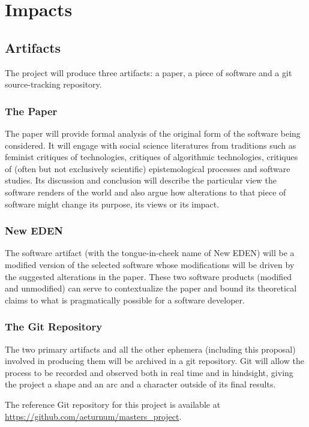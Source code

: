 \documentclass[a4paper,man,natbib]{apa6}
\begin{document}
   \section*{Impacts}
   \subsection*{Artifacts}
   The project will produce three artifacts: a paper, a piece of software and a git source-tracking repository.
   \subsubsection*{The Paper}
   The paper will provide formal analysis of the original form of the software being considered. It will engage with social science literatures from traditions such as feminist critiques of technologies, critiques of algorithmic technologies, critiques of (often but not exclusively scientific) epistemological processes and software studies. Its discussion and conclusion will describe the particular view the software renders of the world and also argue how alterations to that piece of software might change its purpose, its views or its impact.
   \subsubsection*{New EDEN}
   The software artifact (with the tongue-in-cheek name of New EDEN) will be a modified version of the selected software whose modifications will be driven by the suggested alterations in the paper. These two software products (modified and unmodified) can serve to contextualize the paper and bound its theoretical claims to what is pragmatically possible for a software developer.
   \subsubsection*{The Git Repository}
   The two primary artifacts and all the other ephemera (including this proposal) involved in producing them will be archived in a git repository. Git will allow the process to be recorded and observed both in real time and in hindsight, giving the project a shape and an arc and a character outside of its final results. 

   The reference Git repository for this project is available at \url{https://github.com/aeturnum/masters_project}.
\end{document}
